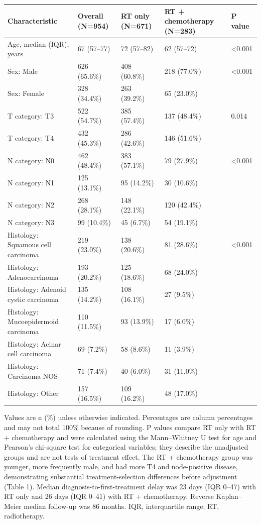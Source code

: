\documentclass[10pt,twocolumn]{article}
\begin{document}
\begin{table}[t]
\centering
\scriptsize
\begin{tabularx}{\textwidth}{@{}XXXXX@{}}
\toprule
\textbf{Characteristic} & \textbf{Overall (N=954)} & \textbf{RT only (N=671)} & \textbf{RT + chemotherapy (N=283)} & \textbf{P value} \\
\midrule
Age, median (IQR), years & 67 (57--77) & 72 (57--82) & 62 (57--72) & <0.001 \\
Sex: Male & 626 (65.6\%) & 408 (60.8\%) & 218 (77.0\%) & <0.001 \\
Sex: Female & 328 (34.4\%) & 263 (39.2\%) & 65 (23.0\%) &  \\
T category: T3 & 522 (54.7\%) & 385 (57.4\%) & 137 (48.4\%) & 0.014 \\
T category: T4 & 432 (45.3\%) & 286 (42.6\%) & 146 (51.6\%) &  \\
N category: N0 & 462 (48.4\%) & 383 (57.1\%) & 79 (27.9\%) & <0.001 \\
N category: N1 & 125 (13.1\%) & 95 (14.2\%) & 30 (10.6\%) &  \\
N category: N2 & 268 (28.1\%) & 148 (22.1\%) & 120 (42.4\%) &  \\
N category: N3 & 99 (10.4\%) & 45 (6.7\%) & 54 (19.1\%) &  \\
Histology: Squamous cell carcinoma & 219 (23.0\%) & 138 (20.6\%) & 81 (28.6\%) & <0.001 \\
Histology: Adenocarcinoma & 193 (20.2\%) & 125 (18.6\%) & 68 (24.0\%) &  \\
Histology: Adenoid cystic carcinoma & 135 (14.2\%) & 108 (16.1\%) & 27 (9.5\%) &  \\
Histology: Mucoepidermoid carcinoma & 110 (11.5\%) & 93 (13.9\%) & 17 (6.0\%) &  \\
Histology: Acinar cell carcinoma & 69 (7.2\%) & 58 (8.6\%) & 11 (3.9\%) &  \\
Histology: Carcinoma NOS & 71 (7.4\%) & 40 (6.0\%) & 31 (11.0\%) &  \\
Histology: Other & 157 (16.5\%) & 109 (16.2\%) & 48 (17.0\%) &  \\
\bottomrule
\end{tabularx}
\end{table}
Values are n (\%) unless otherwise indicated. Percentages are column percentages and may not total 100\% because of rounding. P values compare RT only with RT + chemotherapy and were calculated using the Mann--Whitney U test for age and Pearson's chi-square test for categorical variables; they describe the unadjusted groups and are not tests of treatment effect. The RT + chemotherapy group was younger, more frequently male, and had more T4 and node-positive disease, demonstrating substantial treatment-selection differences before adjustment (Table 1). Median diagnosis-to-first-treatment delay was 23 days (IQR 0--47) with RT only and 26 days (IQR 0--41) with RT + chemotherapy. Reverse Kaplan--Meier median follow-up was 86 months. IQR, interquartile range; RT, radiotherapy.\par
\end{document}
